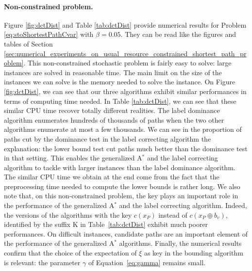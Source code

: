 \documentclass[11pt]{amsart}
\theoremstyle{plain}
\theoremstyle{remark}
\newcommand{\rplus}{\oplus}
\newcommand{\re}{x}
\begin{document}
\paragraph{Non-constrained problem.} 
Figure \ref{fig:dctDist} and Table \ref{tab:dctDist} provide numerical results for Problem \eqref{eq:stoShortestPathCvar} with $\beta = 0.05$. They can be read like the figures and tables of Section \ref{sec:numerical_experiments_on_usual_resource_constrained_shortest_path_problem}. This non-constrained stochastic problem is fairly easy to solve: large instances are solved in reasonable time. The main limit on the size of the instances we can solve is the memory needed to solve the instance. On Figure \ref{fig:dctDist}, we can see that our three algorithms exhibit similar performances in terms of computing time needed. In Table \ref{tab:dctDist}, we can see that these similar CPU time recover totally different realities. The label dominance algorithm enumerates hundreds of thousands of paths when the two other algorithms enumerate at most a few thousands. We can see in the proportion of paths cut by the dominance test in the label correcting algorithm the explanation: the lower bound test cut paths much better than the dominance test in that setting. This enables the generalized A$^{*}$ and the label correcting algorithm to tackle with larger instances than the label dominance algorithm. The similar CPU time we obtain at the end come from the fact that the preprocessing time needed to compute the lower bounds is rather long. We also note that, on this non-constrained problem, the key plays an important role in the performance of the generalized A$^{*}$ and the label correcting algorithm. Indeed, the versions of the algorithms with the key $c(\re_{P})$ instead of $c(\re_{P} \rplus b_{v})$, identified by the suffix K in Table~\ref{tab:dctDist} exhibit much poorer performances. On difficult instances, candidate paths are an important element of the performance of the generalized A$^{*}$ algorithms. Finally, the numerical results confirm that the choice of the expectation of $\xi$ as key in the bounding algorithm is relevant: the parameter $\gamma$ of Equation~\eqref{eq:gamma} remains small.
\end{document}
